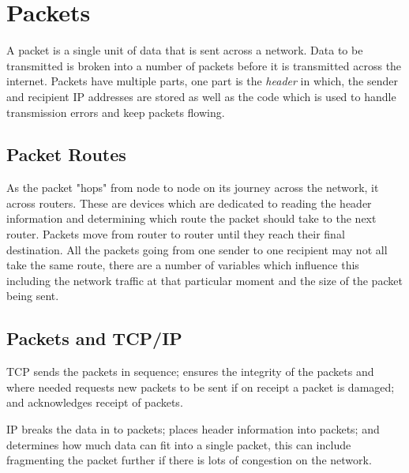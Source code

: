 \section*{Packets}
A packet is a single unit of data that is sent across a network. Data to be transmitted is broken into a number of packets before it is transmitted across the internet. Packets have multiple parts, one part is the \textit{header} in which, the sender and recipient IP addresses are stored as well as the code which is used to handle transmission errors and keep packets flowing.
\subsection*{Packet Routes}
As the packet "hops" from node to node on its journey across the network, it across routers. These are devices which are dedicated to reading the header information and determining which route the packet should take to the next router. Packets move from router to router until they reach their final destination. All the packets going from one sender to one recipient may not all take the same route, there are a number of variables which influence this including the network traffic at that particular moment and the size of the packet being sent. 
\subsection*{Packets and TCP/IP}
TCP sends the packets in sequence; ensures the integrity of the packets and where needed requests new packets to be sent if on receipt a packet is damaged; and acknowledges receipt of packets. 

IP breaks the data in to packets; places header information into packets; and determines how much data can fit into a single packet, this can include fragmenting the packet further if there is lots of congestion on the network. 

